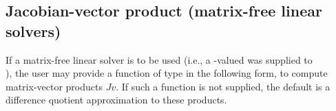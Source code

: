 

\subsection{Jacobian-vector product (matrix-free linear solvers)}\label{ss:jtimesFn}

If a matrix-free linear solver is to be used (i.e., a -valued
{\sunmatrix} was supplied to \\ \noindent {}), the user may
provide a function of type  in the following form,
to compute matrix-vector products $Jv$. If such a function is not supplied,
the default is a difference quotient approximation to these products.

